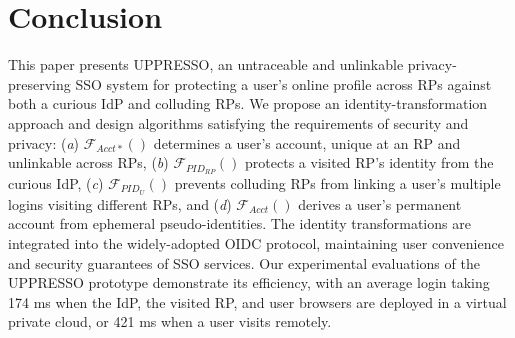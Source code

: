 \section{Conclusion}
\label{sec:conclusion}
This paper presents UPPRESSO, an untraceable and unlinkable privacy-preserving SSO system for protecting a user's online profile across RPs against both a curious IdP and colluding RPs.
We propose an identity-transformation approach and design algorithms satisfying the requirements of security and privacy: (\emph{a}) $\mathcal{F}_{Acct\ast}()$ determines a user's account, unique at an RP and unlinkable across RPs,
(\emph{b}) $\mathcal{F}_{PID_{RP}}()$ protects a visited RP's identity from the curious IdP, (\emph{c}) $\mathcal{F}_{PID_{U}}()$ prevents colluding RPs from linking a user's multiple logins visiting different RPs, and (\emph{d}) $\mathcal{F}_{Acct}()$ derives a user's permanent account from ephemeral pseudo-identities.
The identity transformations are integrated into the widely-adopted OIDC protocol, maintaining user convenience and security guarantees of SSO services. Our experimental evaluations of the UPPRESSO prototype demonstrate its efficiency, with an average login taking 174 ms when the IdP, the visited RP, and user browsers are deployed in a virtual private cloud, or 421 ms when a user visits remotely.


\newpage